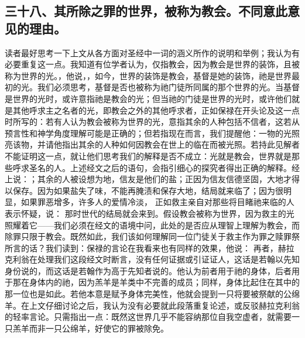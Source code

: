 
\subsection{三十八、其所除之罪的世界，被称为教会。不同意此意见的理由。}

读者最好思考一下上文从各方面对圣经中一词的涵义所作的说明和举例；我认为有必要重复这一点。我知道有位学者认为，仅指教会，因为教会是世界的装饰，且被称为世界的光。，他说，，如今，世界的装饰是教会，基督是她的装饰，祂是世界最初的光。我们必须思考，基督是否也被称为祂门徒所同属的那个世界的光。当基督是世界的光时，或许意指祂是教会的光；但当祂的门徒是世界的光时，或许他们就是其他呼求主之名者的光，即教会之外的其他呼求者，正如保禄在开头论及这一点时所写的：若有人认为教会被称为世界的光，意指其余的人种包括不信者，这若从预言性和神学角度理解可能是正确的；但若指现在而言，我们提醒他：一物的光照亮该物，并请他指出其余的人种如何因教会在世上的临在而被光照。若持此见解者不能证明这一点，就让他们思考我们的解释是否不成立：光就是教会，世界就是那些呼求圣名的人。上述经文之后的语句，会指引细心的探究者得出正确的解释。经上说：；其余的人被设想为地，信友是他们的盐；正因为信友信德坚固，大地才得以保存。因为如果盐失了味，不能再腌渍和保存大地，结局就来临了；因为很明显，如果罪恶增多，许多人的爱情冷淡， 正如救主亲自对那些将目睹祂来临的人表示怀疑，说： 那时世代的结局就会来到。假设教会被称为世界，因为救主的光照耀着它——我们必须在经文的语境中问，此处的是否应从理智上理解为教会，而除罪只限于教会。既然如此，我们该如何理解同一位门徒关于救主作为罪之赎罪祭所言的话？我们读到：保禄的言论在我看来也有同样的效果，他说： 再者，赫拉克利翁在处理我们这段经文时断言，没有任何证据或引证证人，这话是若翰以先知身份说的，而这话是若翰作为高于先知者说的。他认为前者用于祂的身体，后者用于那在身体内的祂，因为羔羊是羊类中不完善的成员；同样，身体比起住在其中的那一位也是如此。若他本意是赋予身体完美性，他就会提到一只将要被祭献的公绵羊。在上文仔细讨论之后，我认为没有必要就此段落重复论述，或反驳赫拉克利翁的轻率言论。只需指出一点：既然这世界几乎不能容纳那位自我空虚者，就需要一只羔羊而非一只公绵羊，好使它的罪被除免。\par

